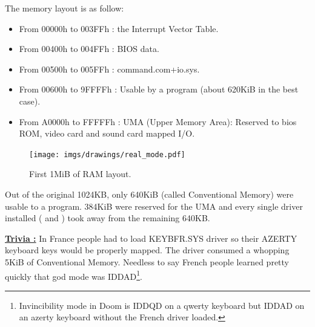 \documentclass[book.tex]{subfiles}
\begin{document}
  \bigskip
The memory layout is as follow:\\
\begin{itemize}
\item From 00000h to 003FFh : the Interrupt Vector Table.
\item From 00400h to 004FFh : BIOS data.
\item From 00500h to 005FFh : command.com+io.sys.
\item From 00600h to 9FFFFh : Usable by a program (about 620KiB in the best case). 
\item From A0000h to FFFFFh : UMA (Upper Memory Area): Reserved to bios ROM, video card and sound card mapped I/O.
\end{itemize}

\begin{figure}[H]
\centering
\texttt{[image: imgs/drawings/real\_mode.pdf]}

\caption{First 1MiB of RAM layout.}
\label{fig:fp_internals}
\end{figure}


Out of the original 1024KB, only 640KiB (called Conventional Memory) were usable to a program. 384KiB were reserved for the UMA and every single driver installed ( and )  took away from the remaining 640KB.

\bigskip

\textbf{\underline{Trivia :}}  In France people had to load KEYBFR.SYS driver so their AZERTY keyboard keys would be properly mapped. The driver consumed a whopping 5KiB of Conventional Memory. Needless to say French people learned pretty quickly that god mode was IDDAD\footnote{Invincibility mode in Doom is IDDQD on a qwerty keyboard but IDDAD on an azerty keyboard without the French driver loaded.}.\\
\par
\end{document}
